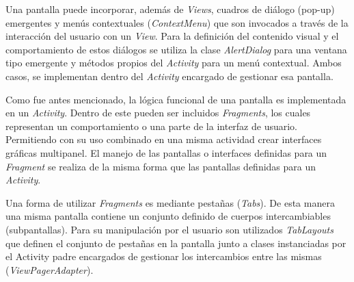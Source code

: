     
    \par Una pantalla puede incorporar, además de \textit{Views}, cuadros de diálogo (pop-up) emergentes y menús contextuales (\textit{ContextMenu}) que son invocados a través de la interacción del usuario con un \textit{View}. Para la definición del contenido visual y el comportamiento de estos diálogos se utiliza la clase \textit{AlertDialog} para una ventana tipo emergente y métodos propios del \textit{Activity} para un menú contextual. Ambos casos, se implementan dentro del \textit{Activity} encargado de gestionar esa pantalla.
    
    \par Como fue antes mencionado, la lógica funcional de una pantalla es implementada en un \textit{Activity}. Dentro de este pueden ser incluidos \textit{Fragments}, los cuales representan un comportamiento o una parte de la interfaz de usuario. Permitiendo con su uso combinado en una misma actividad crear interfaces gráficas multipanel. El manejo de las pantallas o interfaces definidas para un \textit{Fragment} se realiza de la misma forma que las pantallas definidas para un \textit{Activity}.
    
    \par Una forma de utilizar \textit{Fragments} es mediante pestañas (\textit{Tabs}). De esta manera una misma pantalla contiene un conjunto definido de cuerpos intercambiables (subpantallas). Para su manipulación por el usuario son utilizados \textit{TabLayouts} que definen el conjunto de pestañas en la pantalla junto a clases instanciadas por el Activity padre encargados de gestionar los intercambios entre las mismas (\textit{ViewPagerAdapter}).
    
    
    
